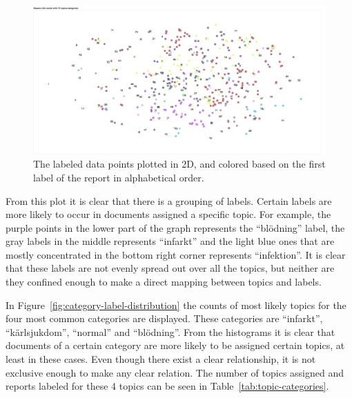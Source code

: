 \begin{figure}
    \centering
    \includegraphics[width=\textwidth]{figures/categories-lda-75.png}
    \caption{The labeled data points plotted in 2D, and colored based on the first label of the report in alphabetical order.}
    \label{fig:categories-lda-75}
\end{figure}

From this plot it is clear that there is a grouping of labels.
Certain labels are more likely to occur in documents assigned a specific topic.
For example, the purple points in the lower part of the graph represents the ``blödning'' label, the gray labels in the middle represents ``infarkt'' and the light blue ones that are mostly concentrated in the bottom right corner represents ``infektion''.
It is clear that these labels are not evenly spread out over all the topics, but neither are they confined enough to make a direct mapping between topics and labels.


In Figure~\ref{fig:category-label-distribution} the counts of most likely topics for the four most common categories are displayed.
These categories are ``infarkt'', ``kärlsjukdom'', ``normal'' and ``blödning''.
From the histograms it is clear that documents of a certain category are more likely to be assigned certain topics, at least in these cases.
Even though there exist a clear relationship, it is not exclusive enough to make any clear relation.
The number of topics assigned and reports labeled for these 4 topics can be seen in Table~\ref{tab:topic-categories}.

